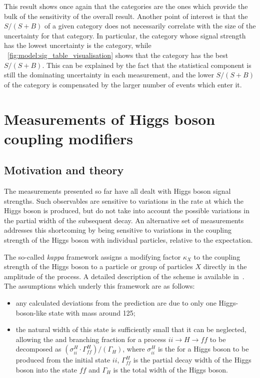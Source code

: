 This result shows once again that the \Untagged categories are the ones which provide the bulk of the sensitivity of the overall result. Another point of interest is that the $S/(S+B)$ of a given category does not necessarily correlate with the size of the uncertainty for that category. In particular, the category whose signal strength has the lowest uncertainty is the  category, while \Fig~\ref{fig:model:sig_table_visualisation} shows that the  category has the best $S/(S+B)$. This can be explained by the fact that the statistical component is still the dominating uncertainty in each measurement, and the lower $S/(S+B)$ of the  category is compensated by the larger number of events which enter it. 

\section{Measurements of Higgs boson coupling modifiers}
\label{sec:statandresults:kappas}
\subsection{Motivation and theory}

The measurements presented so far have all dealt with Higgs boson signal strengths. Such observables are sensitive to variations in the rate at which the Higgs boson is produced, but do not take into account the possible variations in the partial width of the subsequent decay. An alternative set of measurements addresses this shortcoming by being sensitive to variations in the coupling strength of the Higgs boson with individual particles, relative to the \SM expectation. 

The so-called \emph{kappa} framework assigns a modifying factor $\kappa_{X}$ to the coupling strength of the Higgs boson to a particle or group of particles $X$ directly in the amplitude of the process. A detailed description of the scheme is available in~\cite{Khachatryan:2016vau}. 
The assumptions which underly this framework are as follows: 
\begin{itemize}
\item any calculated deviations from the \SM prediction are due to only one Higgs-boson-like state with mass around 125\GeV;
\item the natural width of this state is sufficiently small that it can be neglected, allowing the \crosssection and branching fraction for a process $ii\rightarrow H \rightarrow ff$ to be decomposed as $(\sigma_{ii}^{H} \cdot \Gamma_{ff}^{H}) / (\Gamma_H)$, where $\sigma_{ii}^{H}$ is the \crosssection for a Higgs boson to be produced from the initial state $ii$, $\Gamma^{H}_{ff}$ is the partial decay width of the Higgs boson into the state $ff$ and $\Gamma_{H}$ is the total width of the Higgs boson.
\end{itemize}

